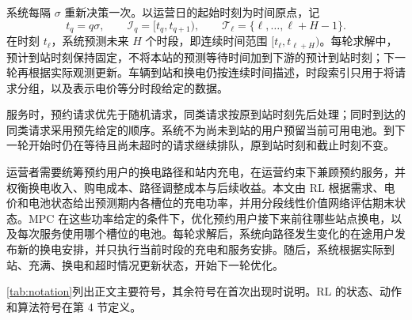 \documentclass[12pt,a4paper,UTF8]{ctexart}
\begin{document}
系统每隔 $\sigma$ 重新决策一次。以运营日的起始时刻为时间原点，记
\[
t_q=q\sigma,
\qquad
\mathcal I_q=[t_q,t_{q+1}),
\qquad
\mathcal T_\ell=\{\ell,\ldots,\ell+H-1\}.
\]
在时刻 $t_\ell$，系统预测未来 $H$ 个时段，即连续时间范围 $[t_\ell,t_{\ell+H})$。每轮求解中，预计到站时刻保持固定，不将本站的预测等待时间加到下游的预计到站时刻；下一轮再根据实际观测更新。车辆到站和换电仍按连续时间描述，时段索引只用于将请求分组，以及表示电价等分时段给定的数据。

服务时，预约请求优先于随机请求，同类请求按原到站时刻先后处理；同时到达的同类请求采用预先给定的顺序。系统不为尚未到站的用户预留当前可用电池。到下一轮开始时仍在等待且尚未超时的请求继续排队，原到站时刻和截止时刻不变。

运营者需要统筹预约用户的换电路径和站内充电，在运营约束下兼顾预约服务，并权衡换电收入、购电成本、路径调整成本与后续收益。本文由 RL 根据需求、电价和电池状态给出预测期内各槽位的充电功率，并用分段线性价值网络评估期末状态。MPC 在这些功率给定的条件下，优化预约用户接下来前往哪些站点换电，以及每次服务使用哪个槽位的电池。每轮求解后，系统向路径发生变化的在途用户发布新的换电安排，并只执行当前时段的充电和服务安排。随后，系统根据实际到站、充满、换电和超时情况更新状态，开始下一轮优化。

\autoref{tab:notation}列出正文主要符号，其余符号在首次出现时说明。RL 的状态、动作和算法符号在第 4 节定义。
\end{document}
